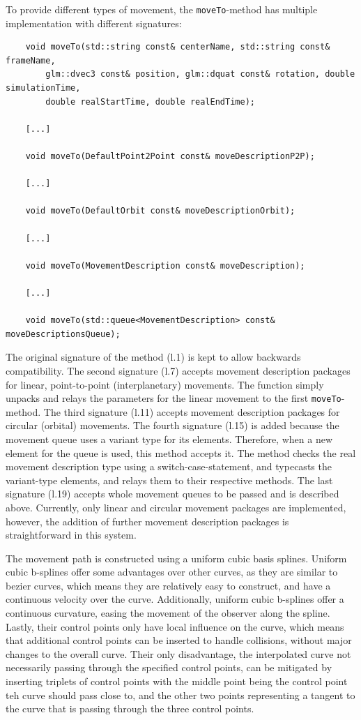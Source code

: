 To provide different types of movement, the \texttt{moveTo}-method has multiple implementation with different
signatures:
\begin{verbatim}
    void moveTo(std::string const& centerName, std::string const& frameName,
        glm::dvec3 const& position, glm::dquat const& rotation, double simulationTime,
        double realStartTime, double realEndTime);

    [...]

    void moveTo(DefaultPoint2Point const& moveDescriptionP2P);

    [...]

    void moveTo(DefaultOrbit const& moveDescriptionOrbit);

    [...]

    void moveTo(MovementDescription const& moveDescription);

    [...]

    void moveTo(std::queue<MovementDescription> const& moveDescriptionsQueue);
\end{verbatim}
The original signature of the method (l.\@1) is kept to allow backwards compatibility.
The second signature (l.\@7) accepts movement description packages for linear, point-to-point (interplanetary)
movements.
The function simply unpacks and relays the parameters for the linear movement to the first \texttt{moveTo}-method.
The third signature (l.\@11) accepts movement description packages for circular (orbital) movements.
The fourth signature (l.\@15) is added because the movement queue uses a variant type for its elements.
Therefore, when a new element for the queue is used, this method accepts it.
The method checks the real movement description type using a switch-case-statement, and typecasts the variant-type
elements, and relays them to their respective methods.
The last signature (l.\@19) accepts whole movement queues to be passed and is described above.
Currently, only linear and circular movement packages are implemented, however, the addition of further movement
description packages is straightforward in this system.

The movement path is constructed using a uniform cubic basis splines.
Uniform cubic b-splines offer some advantages over other curves, as they are similar to bezier curves, which means
they are relatively easy to construct, and have a continuous velocity over the curve.
Additionally, uniform cubic b-splines offer a continuous curvature, easing the movement of the observer along the
spline.
Lastly, their control points only have local influence on the curve, which means that additional control points can
be inserted to handle collisions, without major changes to the overall curve.
Their only disadvantage, the interpolated curve not necessarily passing through the specified control points, can be
mitigated by inserting triplets of control points with the middle point being the control point teh curve should pass
close to, and the other two points representing a tangent to the curve that is passing through the three control points.

